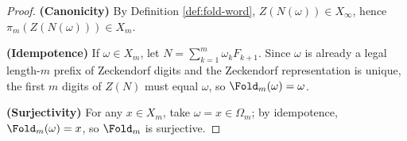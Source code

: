 \begin{proof}
\textbf{(Canonicity)} By Definition \ref{def:fold-word}, $Z(N(\omega))\in X_\infty$, hence $\pi_m(Z(N(\omega)))\in X_m$.

\textbf{(Idempotence)} If $\omega\in X_m$, let $N=\sum_{k=1}^m \omega_k F_{k+1}$. Since $\omega$ is already a legal length-$m$ prefix of Zeckendorf digits and the Zeckendorf representation is unique, the first $m$ digits of $Z(N)$ must equal $\omega$, so $\Fold_m(\omega)=\omega$.

\textbf{(Surjectivity)} For any $x\in X_m$, take $\omega=x\in\Omega_m$; by idempotence, $\Fold_m(\omega)=x$, so $\Fold_m$ is surjective.
\end{proof}
